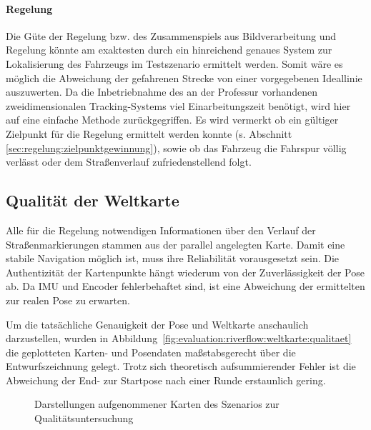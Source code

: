 \paragraph{Regelung} 
Die Güte der Regelung bzw. des Zusammenspiels aus Bildverarbeitung und Regelung könnte am exaktesten durch ein hinreichend genaues System zur Lokalisierung des Fahrzeugs im Testszenario ermittelt werden. Somit wäre es möglich die Abweichung der gefahrenen Strecke von einer vorgegebenen Ideallinie auszuwerten. Da die Inbetriebnahme des an der Professur vorhandenen zweidimensionalen Tracking-Systems viel Einarbeitungszeit benötigt, wird hier auf eine einfache Methode zurückgegriffen. Es wird vermerkt ob ein gültiger Zielpunkt für die Regelung ermittelt werden konnte (s. Abschnitt \ref{sec:regelung:zielpunktgewinnung}), sowie ob das Fahrzeug die Fahrspur völlig verlässt oder dem Straßenverlauf zufriedenstellend folgt.

\subsection{Qualität der Weltkarte  \dcfirstauthorshort}
Alle für die Regelung notwendigen Informationen über den Verlauf der Straßenmarkierungen stammen aus der parallel angelegten Karte. Damit eine stabile Navigation möglich ist, muss ihre Reliabilität vorausgesetzt sein. Die Authentizität der Kartenpunkte hängt wiederum von der Zuverlässigkeit der Pose ab. Da IMU und Encoder fehlerbehaftet sind, ist eine Abweichung der ermittelten zur realen Pose zu erwarten. 

Um die tatsächliche Genauigkeit der Pose und Weltkarte anschaulich darzustellen, wurden in Abbildung~\ref{fig:evaluation:riverflow:weltkarte:qualitaet} die geplotteten Karten- und Posendaten maßstabsgerecht über die Entwurfszeichnung gelegt. Trotz sich theoretisch aufsummierender Fehler ist die Abweichung der End- zur Startpose nach einer Runde erstaunlich gering.

\begin{figure}[htbp] %
	\centering
	
	\hfill
	\caption{Darstellungen aufgenommener Karten des Szenarios zur Qualitätsuntersuchung}
	
\end{figure} 

